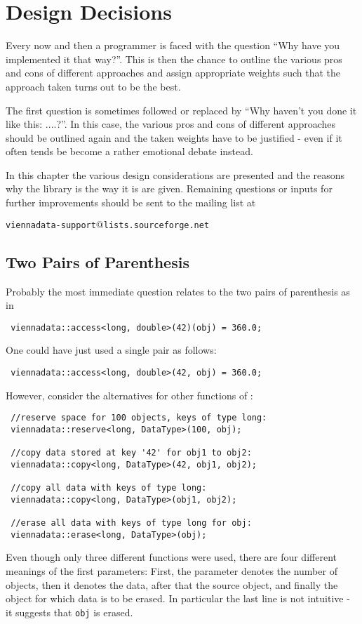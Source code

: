 \chapter{Design Decisions} \label{chap:design}

Every now and then a programmer is faced with the question ``Why have you implemented it that way?''.
This is then the chance to outline the various pros and cons of different approaches and assign appropriate weights such that the approach taken turns out to be the best.

The first question is sometimes followed or replaced by ``Why haven't you done it like this: ....?''.
In this case, the various pros and cons of different approaches should be outlined again and the taken weights have to be justified - even if it often tends be become a rather emotional debate instead.

In this chapter the various design considerations are presented and the reasons why the library is the way it is are given.
Remaining questions or inputs for further improvements should be sent to the mailing list at
\begin{center}
\texttt{viennadata-support$@$lists.sourceforge.net} 
\end{center}

\section{Two Pairs of Parenthesis}
Probably the most immediate question relates to the two pairs of parenthesis as in
\begin{lstlisting}
 viennadata::access<long, double>(42)(obj) = 360.0;
\end{lstlisting}
One could have just used a single pair as follows:
\begin{lstlisting}
 viennadata::access<long, double>(42, obj) = 360.0;
\end{lstlisting}
However, consider the alternatives for other functions of {\ViennaData}:
\begin{lstlisting}
 //reserve space for 100 objects, keys of type long:
 viennadata::reserve<long, DataType>(100, obj);

 //copy data stored at key '42' for obj1 to obj2:
 viennadata::copy<long, DataType>(42, obj1, obj2);

 //copy all data with keys of type long:
 viennadata::copy<long, DataType>(obj1, obj2);

 //erase all data with keys of type long for obj:
 viennadata::erase<long, DataType>(obj);
\end{lstlisting}
Even though only three different functions were used, there are four different meanings of the first parameters:
First, the parameter denotes the number of objects, then it denotes the data, after that the source object, and finally the object for which data is to be erased.
In particular the last line is not intuitive - it suggests that \lstinline|obj| is erased.

